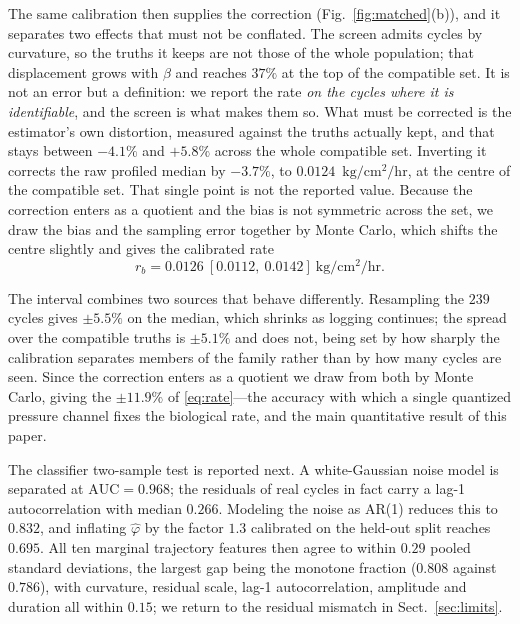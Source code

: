 \documentclass[runningheads]{llncs}
\newcommand{\ratu}{\ensuremath{\mathrm{kg/cm^{2}/hr}}}
\newcommand{\rb}{\ensuremath{r_{b}}}
\begin{document}
The same calibration then supplies the correction
(Fig.~\ref{fig:matched}(b)), and it separates two effects that must not
be conflated. The screen admits cycles by curvature, so the truths it
keeps are not those of the whole population; that displacement grows
with $\beta$ and reaches $37\%$ at the top of the compatible set. It is
not an error but a definition: we report the rate \emph{on the cycles
where it is identifiable}, and the screen is what makes them so. What
must be corrected is the estimator's own distortion, measured against
the truths actually kept, and that stays between $-4.1\%$ and $+5.8\%$
across the whole compatible set. Inverting it corrects the raw
profiled median by $-3.7\%$, to $0.0124$~\ratu{}, at the centre of the
compatible set. That single point is not the reported value. Because
the correction enters as a quotient and the bias is not symmetric
across the set, we draw the bias and the sampling error together by
Monte Carlo, which shifts the centre slightly and gives the calibrated
rate
\begin{equation}
\rb = 0.0126\ [0.0112,\ 0.0142]~\ratu{} .
\label{eq:rate}
\end{equation}

The interval combines two sources that behave differently. Resampling
the $239$ cycles gives $\pm 5.5\%$ on the median, which shrinks as
logging continues; the spread over the compatible truths is
$\pm 5.1\%$ and does not, being set by how sharply the calibration
separates members of the family rather than by how many cycles are
seen. Since the correction enters as a quotient we draw from both by
Monte Carlo, giving the $\pm 11.9\%$ of \eqref{eq:rate}---the accuracy
with which a single quantized pressure channel fixes the biological
rate, and the main quantitative result of this paper.

The classifier two-sample test is reported next. A
white-Gaussian noise model is separated at $\mathrm{AUC}=0.968$; the
residuals of real cycles in fact carry a lag-1 autocorrelation with
median $0.266$. Modeling the noise as AR(1) reduces this to $0.832$,
and inflating $\hat{\varphi}$ by the factor $1.3$ calibrated on the
held-out split reaches $0.695$. All ten marginal trajectory features
then agree to within $0.29$ pooled standard deviations, the largest gap
being the monotone fraction ($0.808$ against $0.786$), with curvature,
residual scale, lag-1 autocorrelation, amplitude and duration all
within $0.15$; we return to the residual mismatch in
Sect.~\ref{sec:limits}.

\label{sec:endpoint}
\end{document}
